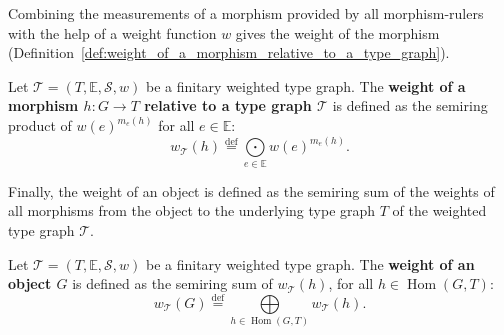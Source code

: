 Combining the measurements of a morphism provided by all morphism-rulers with the help of a weight function $w$ gives the weight of the morphism (Definition~\ref{def:weight_of_a_morphism_relative_to_a_type_graph}).
\begin{definition} 
    \label{def:weight_of_a_morphism_relative_to_a_type_graph}
        Let $\mathcal{T}=(T,\mathbb{E},\mathcal{S},w)$ be a finitary weighted type graph.
         The \textbf{weight of a morphism $h: G \mathop{\rightarrow} T$ relative to a type graph $\mathcal{T}$} is defined as the semiring product of $w(e)^{m_e(h)}$ for all $e \mathop{\in} \mathbb{E}$:
        \[  w_{\mathcal{T}}(h) \overset{\operatorname{def}}{=} \underset{e \mathop{\in} \mathbb{E}}{\mathop{\bigodot}} 
                w(e)^{m_e(h)}.\]
\end{definition}
Finally, the weight of an object is defined as the semiring sum of the weights of all morphisms from the object to the underlying type graph $T$ of the weighted type graph $\mathcal{T}$.
\begin{definition}
    \label{def:weight_of_an_object_relative_to_a_type_graph}
       Let $\mathcal{T}=(T,\mathbb{E},\mathcal{S},w)$ be a finitary weighted type graph. The \textbf{weight of an object \( G \)} is defined as the semiring sum of $w_\mathcal{T}(h)$, for all \( h \mathop{\in} \operatorname{Hom}(G,T) \):
        \[ w_\mathcal{T}(G) \overset{\operatorname{def}}{=} \underset{h \mathop{\in} \operatorname{Hom}(G,T)}{\mathop{\bigoplus}}  w_\mathcal{T}(h). \]
\end{definition}

